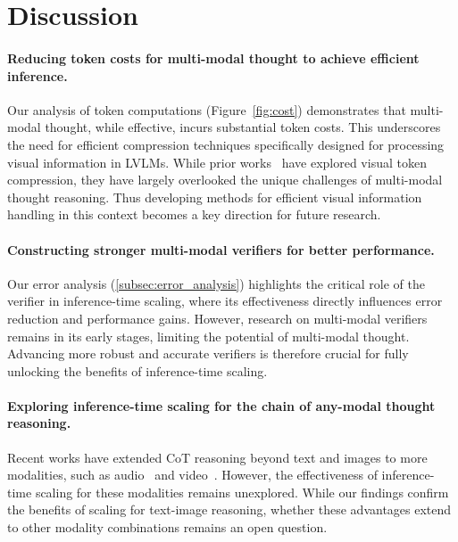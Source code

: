 \section{Discussion}

\paragraph{Reducing token costs for multi-modal thought to achieve efficient inference.}

Our analysis of token computations (Figure~\ref{fig:cost}) demonstrates that multi-modal thought, while effective, incurs substantial token costs.  This underscores the need for efficient compression techniques specifically designed for processing visual information in LVLMs. While prior works~\cite{cost1, cost2, cost3} have explored visual token compression, they have largely overlooked the unique challenges of multi-modal thought reasoning.  Thus developing methods for efficient visual information handling in this context becomes a key direction for future research.

\paragraph{Constructing stronger multi-modal verifiers for better performance.}

Our error analysis (\textsection\ref{subsec:error_analysis}) highlights the critical role of the verifier in inference-time scaling, where its effectiveness directly influences error reduction and performance gains. However, research on multi-modal verifiers~\cite{mm_reward2, mm_reward3, mm_reward4, mm_reward1} remains in its early stages, limiting the potential of multi-modal thought. Advancing more robust and accurate verifiers is therefore crucial for fully unlocking the benefits of inference-time scaling.

\paragraph{Exploring inference-time scaling for the chain of any-modal thought reasoning.}

Recent works have extended CoT reasoning beyond text and images to more modalities, such as audio~\cite{speech_cot} and video~\cite{video_cot}. However, the effectiveness of inference-time scaling for these modalities remains unexplored. While our findings confirm the benefits of scaling for text-image reasoning, whether these advantages extend to other modality combinations remains an open question.